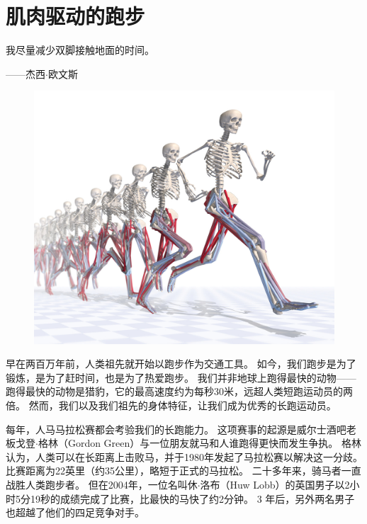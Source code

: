 \chapter{肌肉驱动的跑步} \label{chap:chap12}


我尽量减少双脚接触地面的时间。
\begin{flushright}
	——杰西$\cdot$欧文斯
\end{flushright}

\begin{figure}[!htb]
	\centering
	\includegraphics[width=1.0\linewidth]{chap12/12_0}
	\caption*{ \label{fig:12_0}}
\end{figure}

早在两百万年前，人类祖先就开始以跑步作为交通工具。
如今，我们跑步是为了锻炼，是为了赶时间，也是为了热爱跑步。
我们并非地球上跑得最快的动物——跑得最快的动物是猎豹，它的最高速度约为每秒30米，远超人类短跑运动员的两倍。
然而，我们以及我们祖先的身体特征，让我们成为优秀的长跑运动员。


每年，人马马拉松赛都会考验我们的长跑能力。
这项赛事的起源是威尔士酒吧老板戈登$\cdot$格林（Gordon Green）与一位朋友就马和人谁跑得更快而发生争执。
格林认为，人类可以在长距离上击败马，并于1980年发起了马拉松赛以解决这一分歧。
比赛距离为22英里（约35公里），略短于正式的马拉松。
二十多年来，骑马者一直战胜人类跑步者。
但在2004年，一位名叫休$\cdot$洛布（Huw Lobb）的英国男子以2小时5分19秒的成绩完成了比赛，比最快的马快了约2分钟。
3 年后，另外两名男子也超越了他们的四足竞争对手。


